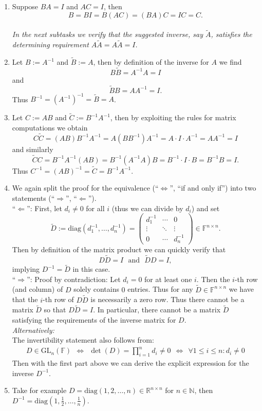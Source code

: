 {\color{solution}
			\begin{enumerate}
			\item 			Suppose $BA = I$ and $AC = I$, then
			$$B = BI =B(AC) = (BA)C=IC = C. $$~\\
			\textit{In the next subtasks we verify that the suggested inverse, say $\widetilde{A}$, satisfies the determining requirement $A\widetilde{A}=A\widetilde{A}=I$.}
			\item Let $B := A^{-1}$ and $\widetilde{B}:= A$, then by definition of the inverse for $A$ we find
			$$B\widetilde{B} = A^{-1}A = I $$
			and
			$$\widetilde{B}B = AA^{-1} = I .$$
			Thus $B^{-1} = ( A^{-1})^{-1} =\widetilde{B}= A$.
			\item Let $C := AB$ and $\widetilde{C}:= B^{-1}  A^{-1}$, then by exploiting the rules for matrix computations we obtain
			$$ C\widetilde{C} = (AB)B^{-1}  A^{-1} = A(BB^{-1})  A^{-1} = A\cdot I \cdot  A^{-1}=A A^{-1} = I$$
			and similarly
			$$ \widetilde{C}C =B^{-1}  A^{-1} (AB) = B^{-1}(A^{-1} A)B = B^{-1}\cdot I \cdot   B =B^{-1}  B = I.$$
			Thus $C^{-1}= (AB)^{-1} = \widetilde{C}= B^{-1}  A^{-1}$.
			\item We again split the proof for the equivalence (``$\Leftrightarrow$'', ``if and only if'') into two statements (``$\Rightarrow$'', ``$\Leftarrow$'').\\ 
			 ``$\Leftarrow$'': First, let $d_i \neq 0$ for all $i$ (thus we can divide by $d_i$) and set 
			$$
			\widetilde{D}:=\text{diag}(d_1^{-1}, \ldots, d_n^{-1}) = 
			 \begin{pmatrix}
			d_1^{-1} & \cdots&0 \\
			\vdots&\ddots&\vdots\\
			0&\cdots&d_n^{-1}
			\end{pmatrix}
		\in\mathbb{F}^{n \times n}.
			$$
			 Then by definition of the matrix product we can quickly verify that
			$$D\widetilde{D} = I ~~~\text{and}~~~ \widetilde{D}D = I,$$
			implying $D^{-1}=\widetilde{D}$ in this case.\\
			``$\Rightarrow$'': Proof by contradiction: Let $d_i = 0$ for at least one $i$. Then the $i$-th row (and column) of $D$ solely contains $0$ entries. Thus for any $\widetilde{D} \in \mathbb{F}^{n \times n}$ we have that the $i$-th row of $D\widetilde{D}$ is necessarily a zero row. Thus there cannot be a matrix $\widetilde{D}$ so that $D\widetilde{D} = I$. In particular, there cannot be a matrix $\widetilde{D}$ satisfying the requirements of the inverse matrix for $D$.~\\
			
			\textit{Alternatively:}\\
			The invertibility statement also follows from:
			\begin{align*}
			D \in \text{GL}_n(\mathbb{F})~~\Leftrightarrow~~\det(D) = \prod_{i=1}^n d_{i} \neq 0 ~~\Leftrightarrow~~ \forall 1\leq i \leq n\colon d_i \neq 0
			\end{align*}
			Then with the first part above we can derive the explicit expression for the inverse $D^{-1}$.
 \item Take for example $D=\text{diag}(1,2,\ldots,n)\in \mathbb{R}^{n \times n}$ for $n\in\mathbb{N}$, then $D^{-1}=\text{diag}(1,\tfrac{1}{2},\ldots,\tfrac{1}{n})$.
		\end{enumerate}
}

